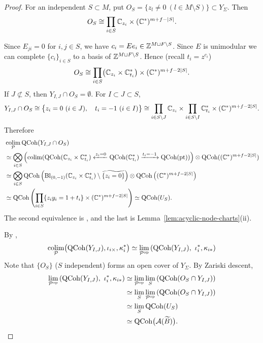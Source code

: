 \documentclass[12pt, letter]{amsart}
\theoremstyle{definition}
\begin{document}
\begin{proof}


For an independent $S\subset M$, put $O_S=\{z_l\ne0\ (l\in M\setminus S)\}\subset Y_\Sigma$. Then \[O_S \cong \prod_{i\in S} \mathbb{C}_{z_i} \times (\mathbb{C}^*)^{m+f-|S|} .\]


Since $E_{ji}=0$ for $i,j\in S$, we have \(c_i = E e_i \in \mathbb{Z}^{M \sqcup F \setminus S}\). Since $E$ is unimodular we can complete \( \{c_i\}_{i\in S}\) to a basis of \( \mathbb{Z}^{M \sqcup F \setminus S} \). Hence (recall \(t_i = z^{c_i}\)) 
\[
 O_S\cong\prod_{i\in S}\bigl(\mathbb{C}_{z_i}\times\mathbb{C}^*_{t_i}\bigr)\times(\mathbb{C}^*)^{m+f-2|S|}.
\]
If \(J \not \subset S\), then  $Y_{I,J}\cap O_S=\emptyset$. For \( I \subset J \subset S\),
\[
Y_{I, J} \cap O_S \cong \big\{ z_i = 0 \ (i \in J), \quad t_i = -1\  (i\in I) \big\} \cong \prod_{i\in S\setminus J} \mathbb{C}_{z_i} \times \prod_{i\in S\setminus I} \mathbb{C}_{t_i}^* \times (\mathbb{C}^*)^{m+f-2|S|}.
\]
Therefore
\begin{align*}
    &\operatorname*{colim}_{ \mathcal{P}} \operatorname{QCoh}( Y_{I, J} \cap O_S) \\
    & \simeq \bigotimes_{i \in S} \left(  \operatorname*{colim} (\operatorname{QCoh}( \mathbb{C}_{z_i} \times \mathbb{C}_{t_i}^* ) \xleftarrow{z_i = 0} \operatorname{QCoh}(\mathbb{C}_{t_i}^*) \xrightarrow{t_i= -1} \operatorname{QCoh}(\mathrm{pt}) ) \right) \otimes \operatorname{QCoh}((\mathbb{C}^*)^{m+f-2|S|} )\\
    &\simeq \bigotimes_{i\in S} \operatorname{QCoh}\left( \mathrm{Bl}_{(0, -1)} (\mathbb{C}_{z_i} \times \mathbb{C}_{t_i}^*) \setminus \widetilde{ \{ z_i = 0\} } \right) \otimes \operatorname{QCoh}\left( (\mathbb{C}^*)^{m+f - 2|S|} \right) \\
     &\simeq \operatorname{QCoh}\left(\prod_{i\in S}\{z_iy_i=1+t_i\}\times(\mathbb{C}^*)^{m+f-2|S|}\right)
    \simeq\operatorname{QCoh}(U_S).
\end{align*}
The second equivalence is \cite[Theorem 4.13]{GLe}, and the last is Lemma~\ref{lem:acyclic-node-charts}(ii). 


















By \cite[Corollary~5.5.3.4 and Theorem~5.5.3.18]{Lurie-HTT},
\[
\operatorname*{colim}_{\mathcal{P}} \bigl(\operatorname{QCoh}(Y_{I,J}), \iota_{i \times}, \kappa_{i}^*\bigr)
    \simeq \lim_{\mathcal{P}^{\mathrm{op}}}
    \left(
    \operatorname{QCoh}(Y_{I,J}), \  \iota_i^*, \kappa_{i*}
    \right)
\]
Note that \(\{O_S\}\) (\(S\) independent) forms an open cover of \( Y_\Sigma\). 
By Zariski descent,
\begin{align*}
    \lim_{\mathcal{P}^{\mathrm{op}}}
    \left(
    \operatorname{QCoh}(Y_{I,J}), \  \iota_i^*, \kappa_{i*}
    \right) 
    &\simeq
    \lim_{\mathcal{P}^{\mathrm{op}}} 
    \lim_{S}
    \left( \operatorname{QCoh}(O_S \cap Y_{I, J} ) \right) \\
    &\simeq\lim_S \lim_{\mathcal{P}^{\mathrm{op}}} 
    \left( \operatorname{QCoh}(O_S \cap Y_{I, J} ) \right) \\
    &\simeq \lim_S \operatorname{QCoh}(U_S) \\
    &\simeq \operatorname{QCoh}\bigl(\mathcal{A}(\widetilde B)\bigr).
\end{align*}
\end{proof}
\end{document}

